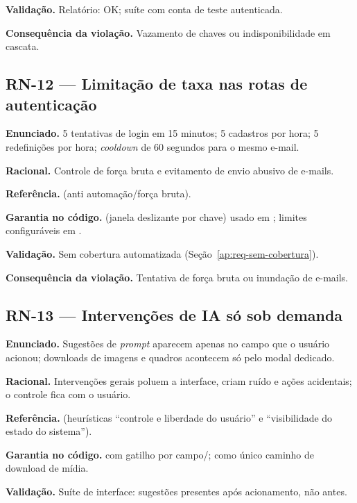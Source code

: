 \textbf{Validação.} Relatório: \texttt{} OK; suíte com conta de teste autenticada.

\textbf{Consequência da violação.} Vazamento de chaves ou indisponibilidade em cascata.

\subsection{RN-12 --- Limitação de taxa nas rotas de autenticação}

\textbf{Enunciado.} 5 tentativas de login em 15 minutos; 5 cadastros por hora; 5 redefinições por hora; \emph{cooldown} de 60 segundos para o mesmo e-mail.

\textbf{Racional.} Controle de força bruta e evitamento de envio abusivo de e-mails.

\textbf{Referência.} \cite{owasp_asvs_2021} (anti automação/força bruta).

\textbf{Garantia no código.}  (janela deslizante por chave) usado em ; limites configuráveis em .

\textbf{Validação.} Sem cobertura automatizada (Seção~\ref{ap:req-sem-cobertura}).

\textbf{Consequência da violação.} Tentativa de força bruta ou inundação de e-mails.

\subsection{RN-13 --- Intervenções de IA só sob demanda}

\textbf{Enunciado.} Sugestões de \emph{prompt} aparecem apenas no campo que o usuário acionou; downloads de imagens e quadros acontecem só pelo modal dedicado.

\textbf{Racional.} Intervenções gerais poluem a interface, criam ruído e ações acidentais; o controle fica com o usuário.

\textbf{Referência.} \cite{nielsen_1993} (heurísticas ``controle e liberdade do usuário'' e ``visibilidade do estado do sistema'').

\textbf{Garantia no código.}  com gatilho por campo/\texttt{}; \texttt{} como único caminho de download de mídia.

\textbf{Validação.} Suíte de interface: sugestões presentes após acionamento, não antes.

